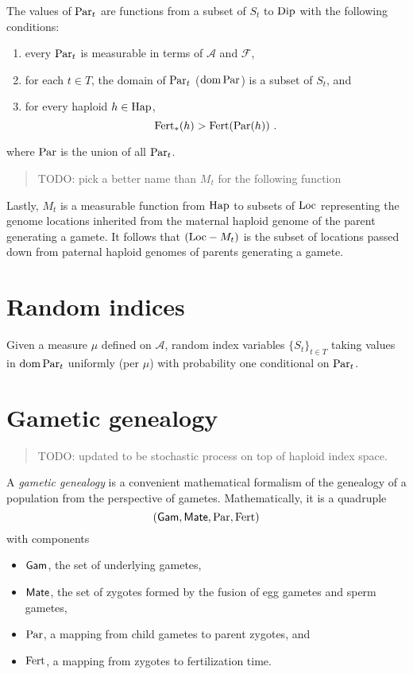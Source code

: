 \documentclass{article}
\begin{document}
The values of $\mathrm{Par}_t$ are functions from a subset of $S_t$ to $\mathrm{Dip}$
with the following conditions:
\begin{enumerate}
\item
  every $\mathrm{Par}_t$ is measurable in terms of $\mathcal{A}$ and $\mathcal{F}$,
\item
  for each $t \in T$, the domain of $\mathrm{Par}_t$ ($\operatorname{dom} \mathrm{Par}$) is a subset of $S_t$, and
\item
  for every haploid $h \in \mathrm{Hap}$,
$$
  \mathrm{Fert}_*(h) > \mathrm{Fert}(\mathrm{Par}(h))
\text{ .}
$$
\end{enumerate}
where $\mathrm{Par}$ is the union of all $\mathrm{Par}_t$.


\begin{quote}
TODO: pick a better name than $M_t$ for the following function
\end{quote}

Lastly, $M_t$ is a measurable function from $\mathrm{Hap}$ to subsets of $\mathrm{Loc}$
representing the genome locations inherited from the maternal haploid genome of the
parent generating a gamete.
It follows that $(\mathrm{Loc} - M_t)$ is the subset of locations passed down from
paternal haploid genomes of parents generating a gamete.


\section{Random indices}

Given a measure $\mu$ defined on $\mathcal{A}$,
random index variables $\{ S_t \}_{t \in T}$ taking values in $\operatorname{dom} \mathrm{Par}_t$ uniformly
(per $\mu$)
with probability one conditional on $\mathrm{Par}_t$.



\section{Gametic genealogy}

\begin{quote}
TODO: updated to be stochastic process on top of haploid index space.
\end{quote}

A \emph{gametic genealogy} is a convenient mathematical formalism of the
genealogy of a population from the perspective of gametes.
Mathematically, it is a quadruple \[
(\mathsf{Gam}, \mathsf{Mate}, \mathrm{Par}, \mathrm{Fert}) 
\] with components

\begin{itemize}
\item
  \(\mathsf{Gam}\), the set of underlying gametes,
\item
  \(\mathsf{Mate}\), the set of zygotes formed by the fusion of egg gametes and
  sperm gametes,
\item
  \(\mathrm{Par}\), a mapping from child gametes to parent zygotes, and
\item
  \(\mathrm{Fert}\), a mapping from zygotes to fertilization time.
\end{itemize}
\end{document}
